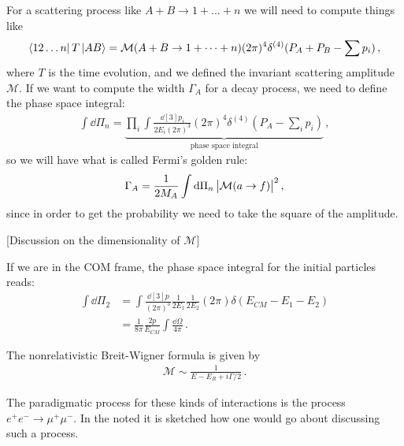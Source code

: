 \documentclass[main.tex]{subfiles}
\begin{document}
For a scattering process like \(A+B \rightarrow 1 + \dots + n\)
we will need to compute things like 
%
\begin{align}
\bra{12 \dots n} T \ket{AB} = \mathcal{M} (A+B \rightarrow 1 + \dots + n) (2\pi )^{4} \delta^{(4)} (P_A + P_B - \sum p_i)
\,,
\end{align}
%
where \(T\) is the time evolution, and we defined the invariant scattering amplitude \(\mathcal{M}\). 
If we want to compute the width \(\Gamma_{A}\) for a decay process, we need to define the phase space integral:
%
\begin{align}
\int \dd{\Pi_{n}} = \underbrace{\prod_{i} \int \frac{ \dd[3]{p_i}}{2 E_i (2 \pi )^3} 
(2\pi )^{4} \delta^{(4)} (P_A - \sum _{i} p_i)}_{\text{phase space integral}}
\,,
\end{align}
%
so we will have what is called Fermi's golden rule:
%
\begin{align}
\Gamma_{A} = \frac{1}{2 M_A} \int \dd{\Pi_{n}} \abs{\mathcal{M} (a \rightarrow f)}^2
\,,
\end{align}
%
since in order to get the probability we need to take the square of the amplitude. 

[Discussion on the dimensionality of \(\mathcal{M}\)]

If we are in the COM frame, the phase space integral for the initial particles reads: 
%
\begin{align}
\int \dd{\Pi_{2}} &= \int \frac{\dd[3]{p}}{(2 \pi )^3} \frac{1}{2 E_1 } \frac{1}{2 E_2 } (2 \pi ) \delta (E_{CM} - E_1 - E_2 )   \\
&= \frac{1}{8 \pi } \frac{2p}{E_{CM}} \int  \frac{\dd{\Omega}}{4 \pi } 
\,.
\end{align}

The nonrelativistic Breit-Wigner formula is given by 
%
\begin{align}
\mathcal{M} \sim \frac{1}{E - E_R + i \Gamma/ 2}  
\,.
\end{align}

The paradigmatic process for these kinds of interactions is the process \(e^{+}e^{-} \to \mu^{+}\mu^- \). 
In the noted it is sketched how one would go about discussing such a process. 

\end{document}
